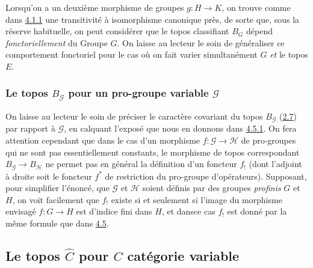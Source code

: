 \documentclass[10pt]{../fichiers-configuration-latex/smfart}
\begin{document}
Lorsqu'on a un deuxième morphisme de groupes $g:H\rightarrow K$,
on trouve comme dans \hyperref[IV.subsubsec4.1.1]{4.1.1} une transitivité à
isomorphisme canonique près, de sorte que, sous la réserve
habituelle, on peut considérer que le topos classifiant $B_G$
dépend \emph{fonctoriellement} du Groupe $G$. On laisse au lecteur
le soin de généraliser ce comportement fonctoriel pour le cas où
on fait varier simultanément $G$ \emph{et} le topos $E$.

\subsubsection{Le topos $B_{𝒢}$ pour un pro-groupe variable
  $𝒢$}

On laisse au lecteur le soin de préciser le caractère covariant
du topos $B_{𝒢}$ (\hyperref[IV.subsec2.7]{2.7}) par rapport à
$𝒢$, en calquant l'exposé que nous en donnons dans
\hyperref[IV.subsubsec4.5.1]{4.5.1}. On fera attention cependant que dans le cas
d'un morphisme $f:𝒢\rightarrow ℋ$ de pro-groupes qui
ne sont pas essentiellement constants, le morphisme de topos
correspondant $B_{𝒢}\rightarrow B_{ℋ}$ ne permet pas
en général la définition d'un foncteur $f_{!}$ (dont l'adjoint
à droite soit le foncteur $f^{\ast}$ de restriction du pro-groupe
d'opérateurs). Supposant, pour simplifier l'énoncé, que
$𝒢$ et $ℋ$ soient définis par des groupes
\emph{profinis} $G$ et $H$, on voit facilement que $f_{!}$ existe si
et seulement si l'image du morphisme envisagé $f:G\rightarrow H$
est d'indice fini dans $H$, et  dans\pageoriginale ce cas $f_{!}$
est donné par la même formule que dans \hyperref[IV.subsec4.5]{4.5}.

\subsection{Le topos $\widehat{C}$ pour $C$ catégorie variable}
\end{document}
